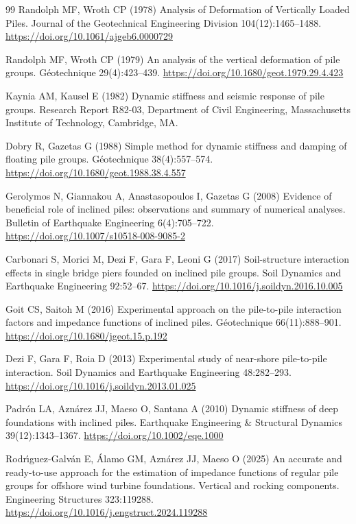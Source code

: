 \documentclass[11pt]{article}
\begin{document}
\begin{thebibliography}{99}
Randolph MF, Wroth CP (1978) Analysis of Deformation of Vertically Loaded Piles. Journal of the Geotechnical Engineering Division 104(12):1465--1488. \url{https://doi.org/10.1061/ajgeb6.0000729}

Randolph MF, Wroth CP (1979) An analysis of the vertical deformation of pile groups. G{\'e}otechnique 29(4):423--439. \url{https://doi.org/10.1680/geot.1979.29.4.423}

Kaynia AM, Kausel E (1982) Dynamic stiffness and seismic response of pile groups. Research Report R82-03, Department of Civil Engineering, Massachusetts Institute of Technology, Cambridge, MA.

Dobry R, Gazetas G (1988) Simple method for dynamic stiffness and damping of floating pile groups. G{\'e}otechnique 38(4):557--574. \url{https://doi.org/10.1680/geot.1988.38.4.557}

Gerolymos N, Giannakou A, Anastasopoulos I, Gazetas G (2008) Evidence of beneficial role of inclined piles: observations and summary of numerical analyses. Bulletin of Earthquake Engineering 6(4):705--722. \url{https://doi.org/10.1007/s10518-008-9085-2}

Carbonari S, Morici M, Dezi F, Gara F, Leoni G (2017) Soil-structure interaction effects in single bridge piers founded on inclined pile groups. Soil Dynamics and Earthquake Engineering 92:52--67. \url{https://doi.org/10.1016/j.soildyn.2016.10.005}

Goit CS, Saitoh M (2016) Experimental approach on the pile-to-pile interaction factors and impedance functions of inclined piles. G{\'e}otechnique 66(11):888--901. \url{https://doi.org/10.1680/jgeot.15.p.192}

Dezi F, Gara F, Roia D (2013) Experimental study of near-shore pile-to-pile interaction. Soil Dynamics and Earthquake Engineering 48:282--293. \url{https://doi.org/10.1016/j.soildyn.2013.01.025}

Padr{\'o}n LA, Azn{\'a}rez JJ, Maeso O, Santana A (2010) Dynamic stiffness of deep foundations with inclined piles. Earthquake Engineering \& Structural Dynamics 39(12):1343--1367. \url{https://doi.org/10.1002/eqe.1000}

Rodr{\'\i}guez-Galv{\'a}n E, {\'A}lamo GM, Azn{\'a}rez JJ, Maeso O (2025) An accurate and ready-to-use approach for the estimation of impedance functions of regular pile groups for offshore wind turbine foundations. Vertical and rocking components. Engineering Structures 323:119288. \url{https://doi.org/10.1016/j.engstruct.2024.119288}


\end{thebibliography}
\end{document}
